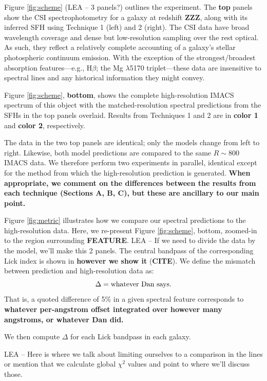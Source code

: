\documentclass[a4paper,fleqn,usenatbib]{mnras}
\newcommand{\resp}{respectively}
\newcommand{\bfr}{\bf\color{red}}
\newcommand{\bfb}{\color{myblue}}
\newcommand{\CITE}{{\bfr CITE}}
\begin{document}
Figure \ref{fig:scheme} {\bfb (LEA -- 3 panels?)} outlines the experiment. The {\bfr top} panels show the
CSI spectrophotometry for a galaxy at redshift {\bfr ZZZ}, along with its inferred SFH using Technique 
1 (left) and 2 (right). The CSI data have broad wavelength 
coverage and dense but low-resolution sampling over the rest optical. As such, they reflect a relatively
complete accounting of a galaxy's stellar photospheric continuum emission. With the exception of the
strongest/broadest absorption features---e.g., H$\beta$; the Mg $\lambda$5170 triplet---these data are 
insensitive to spectral lines and any historical information they might convey.

Figure \ref{fig:scheme}, {\bfr bottom}, shows the complete high-resolution IMACS spectrum of 
this object with the matched-resolution spectral predictions from the SFHs in the top panels overlaid. 
Results from Techniques 1 and 2 are in {\bfr color 1} and {\bfr color 2}, \resp. 

The data in the two top panels are identical; only the models change from left to right. Likewise,
both model predictions are compared to the same $R\sim800$ IMACS data. We therefore perform two 
experiments in parallel, identical except for the method from which the high-resolution prediction is 
generated. {\bfr When appropriate, we comment on the differences between the results from each
technique (Sections A, B, C), but these are ancillary to our main point.}

Figure \ref{fig:metric} illustrates how we compare our spectral predictions to the high-resolution data.
Here, we re-present Figure \ref{fig:scheme}, bottom, zoomed-in to the region surrounding {\bfr FEATURE}.
{\bfb LEA -- If we need to divide the data by the model, we'll make this 2 panels.} The central 
bandpass of the corresponding Lick index is shown in {\bfr however we show it} (\CITE). We define 
the mismatch between prediction and high-resolution data as:
\begin{equation}
	\Delta = {\rm whatever~Dan~says}.
\end{equation}
That is, a quoted difference of 5\% in a given spectral feature corresponds to {\bfr whatever per-angstrom
offset integrated over however many angstroms, or whatever Dan did.}

We then compute {\bfr$\Delta$} for each Lick bandpass in each galaxy.

{\bfb LEA -- Here is where we talk about limiting ourselves to a comparison in the lines or mention
that we calculate global $\chi^{2}$ values and point to where we'll discuss those.}
\end{document}
